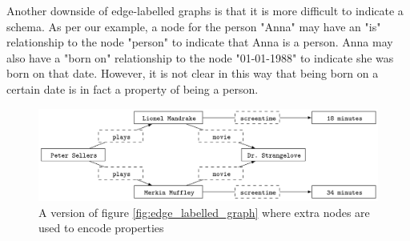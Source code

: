 Another downside of edge-labelled graphs is that it is more difficult to indicate a schema. As per our example, a node for the person "Anna" may have an "is" relationship to the node "person" to indicate that Anna is a person. Anna may also have a "born on" relationship to the node "01-01-1988" to indicate she was born on that date. However, it is not clear in this way that being born on a certain date is in fact a property of being a person.

\begin{figure}
    \includegraphics[width=\textwidth]{figures/edge_labelled_graph_downside.png}
    \caption{A version of figure \ref{fig:edge_labelled_graph} where extra nodes are used to encode properties \cite{2017ADatabases}}
    \label{fig:edge_labelled_graph_downsides}
\end{figure}